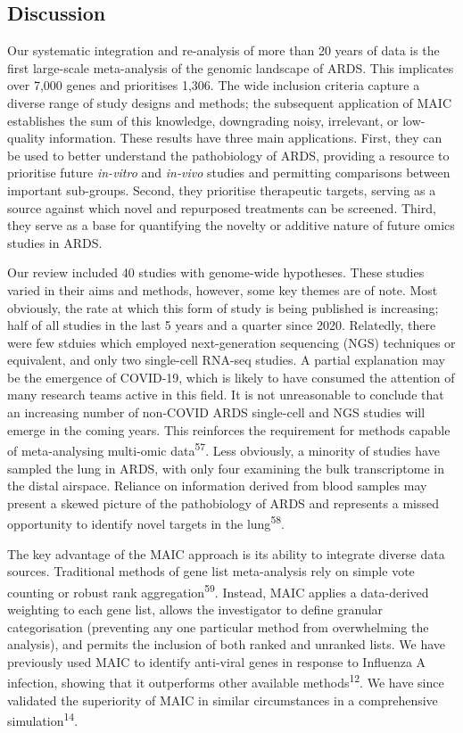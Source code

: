 \documentclass[
  11,
  a4paper,
]{article}
\begin{document}
\newpage

\hypertarget{discussion}{%
\subsection{Discussion}\label{discussion}}

Our systematic integration and re-analysis of more than 20 years of data
is the first large-scale meta-analysis of the genomic landscape of ARDS.
This implicates over 7,000 genes and prioritises 1,306. The wide
inclusion criteria capture a diverse range of study designs and methods;
the subsequent application of MAIC establishes the sum of this
knowledge, downgrading noisy, irrelevant, or low-quality information.
These results have three main applications. First, they can be used to
better understand the pathobiology of ARDS, providing a resource to
prioritise future \emph{in-vitro} and \emph{in-vivo} studies and
permitting comparisons between important sub-groups. Second, they
prioritise therapeutic targets, serving as a source against which novel
and repurposed treatments can be screened. Third, they serve as a base
for quantifying the novelty or additive nature of future omics studies
in ARDS.

Our review included 40 studies with genome-wide hypotheses. These
studies varied in their aims and methods, however, some key themes are
of note. Most obviously, the rate at which this form of study is being
published is increasing; half of all studies in the last 5 years and a
quarter since 2020. Relatedly, there were few stduies which employed
next-generation sequencing (NGS) techniques or equivalent, and only two
single-cell RNA-seq studies. A partial explanation may be the emergence
of COVID-19, which is likely to have consumed the attention of many
research teams active in this field. It is not unreasonable to conclude
that an increasing number of non-COVID ARDS single-cell and NGS studies
will emerge in the coming years. This reinforces the requirement for
methods capable of meta-analysing multi-omic data\textsuperscript{57}.
Less obviously, a minority of studies have sampled the lung in ARDS,
with only four examining the bulk transcriptome in the distal airspace.
Reliance on information derived from blood samples may present a skewed
picture of the pathobiology of ARDS and represents a missed opportunity
to identify novel targets in the lung\textsuperscript{58}.

The key advantage of the MAIC approach is its ability to integrate
diverse data sources. Traditional methods of gene list meta-analysis
rely on simple vote counting or robust rank
aggregation\textsuperscript{59}. Instead, MAIC applies a data-derived
weighting to each gene list, allows the investigator to define granular
categorisation (preventing any one particular method from overwhelming
the analysis), and permits the inclusion of both ranked and unranked
lists. We have previously used MAIC to identify anti-viral genes in
response to Influenza A infection, showing that it outperforms other
available methods\textsuperscript{12}. We have since validated the
superiority of MAIC in similar circumstances in a comprehensive
simulation\textsuperscript{14}.
\end{document}
